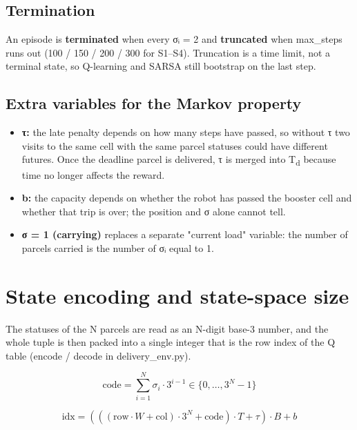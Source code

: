 \documentclass[12pt,a4paper]{article}
\begin{document}
\hypertarget{termination}{%
\subsection{Termination}\label{termination}}

An episode is \textbf{terminated} when every σᵢ = 2 and
\textbf{truncated} when max\_steps runs out (100 / 150 / 200 / 300 for
S1--S4). Truncation is a time limit, not a terminal state, so Q-learning
and SARSA still bootstrap on the last step.

\hypertarget{extra-variables-for-the-markov-property}{%
\subsection{Extra variables for the Markov
property}\label{extra-variables-for-the-markov-property}}

\begin{itemize}
\item
  \textbf{τ:} the late penalty depends on how many steps have passed, so
  without τ two visits to the same cell with the same parcel statuses
  could have different futures. Once the deadline parcel is delivered, τ
  is merged into T\textsubscript{d} because time no longer affects the
  reward.
\item
  \textbf{b:} the capacity depends on whether the robot has passed the
  booster cell and whether that trip is over; the position and σ alone
  cannot tell.
\item
  \textbf{σ = 1 (carrying)} replaces a separate "current load" variable:
  the number of parcels carried is the number of σᵢ equal to 1.
\end{itemize}

\hypertarget{state-encoding-and-state-space-size}{%
\section{State encoding and state-space
size}\label{state-encoding-and-state-space-size}}

The statuses of the N parcels are read as an N-digit base-3 number, and
the whole tuple is then packed into a single integer that is the row
index of the Q table (encode / decode in delivery\_env.py).

\[\text{code} = \sum_{i = 1}^{N}{\sigma_{i} \cdot 3^{i - 1}} \in \{ 0,\ldots,3^{N} - 1\}\]

\[\text{idx} = \left( \left( \left( \text{row} \cdot W + \text{col} \right) \cdot 3^{N} + \text{code} \right) \cdot T + \tau \right) \cdot B + b\]
\end{document}
